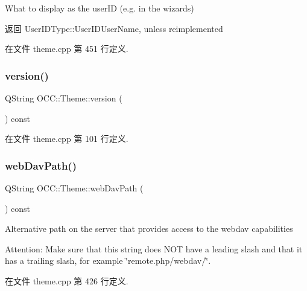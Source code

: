 What to display as the user\+ID (e.\+g. in the wizards) 

\begin{DoxyReturn}{返回}
User\+I\+D\+Type\+::\+User\+I\+D\+User\+Name, unless reimplemented 
\end{DoxyReturn}


在文件 theme.\+cpp 第 451 行定义.

\mbox{\label{class_o_c_c_1_1_theme_a9b457f4102f98cc7709d5eaf77dcb47c}} 
\subsubsection{\texorpdfstring{version()}{version()}}
{\footnotesize\ttfamily Q\+String O\+C\+C\+::\+Theme\+::version (\begin{DoxyParamCaption}{ }\end{DoxyParamCaption}) const\hspace{0.3cm}{\ttfamily [virtual]}}



在文件 theme.\+cpp 第 101 行定义.

\mbox{\label{class_o_c_c_1_1_theme_ac31242fa479e2b15711ea5d3cd9df363}} 
\subsubsection{\texorpdfstring{web\+Dav\+Path()}{webDavPath()}}
{\footnotesize\ttfamily Q\+String O\+C\+C\+::\+Theme\+::web\+Dav\+Path (\begin{DoxyParamCaption}{ }\end{DoxyParamCaption}) const\hspace{0.3cm}{\ttfamily [virtual]}}

Alternative path on the server that provides access to the webdav capabilities

Attention\+: Make sure that this string does N\+OT have a leading slash and that it has a trailing slash, for example \char`\"{}remote.\+php/webdav/\char`\"{}. 

在文件 theme.\+cpp 第 426 行定义.

\mbox{\label{class_o_c_c_1_1_theme_a612f8d248692a32c295009c68fd670c5}} 
